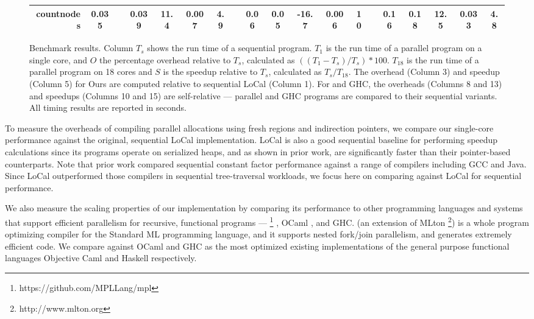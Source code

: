 \begin{figure}
\begin{tabular}{@{}r cc cccc r ccccc r ccccc@{}}
    countnodes & 0.035 && 0.039 & 11.4 & 0.007 & 4.9 && 0.06 & 0.05 & -16.7 & 0.006 & 10 && 0.16 & 0.18 & 12.5 & 0.033 & 4.8 \\

    \bottomrule
  \end{tabular}
  \vspace{2mm}
  \normalsize
  \caption{
    Benchmark results.
    Column $T_s$ shows the run time of a sequential program.
    $T_1$ is the run time of a parallel program on a single core, and
    $O$ the percentage overhead relative to $T_s$, calculated as
    $((T_1 - T_s) / T_s) * 100$.
    $T_{18}$ is the run time of a parallel program on 18 cores and
    $S$ is the speedup relative to $T_s$, calculated as $T_s / T_{18}$.
    The overhead (Column 3) and speedup (Column 5) for Ours are
    computed relative to sequential LoCal (Column 1).
    For \MPL{} and GHC, the overheads (Columns 8 and 13) and speedups (Columns 10 and 15)
    are self-relative ---
    parallel \MPL{} and GHC programs are compared to their sequential variants.
    All timing results are reported in seconds.
  }
  \label{fig:benchmark-results}
\end{figure}

To measure the overheads of compiling parallel allocations using
fresh regions and indirection pointers, we compare our single-core performance
against the original, sequential LoCal implementation.
%
LoCal is also a good sequential baseline for performing speedup calculations
since its programs operate on serialized heaps, and
as shown in prior work, are significantly faster than their pointer-based counterparts.
%
Note that prior work \cite{Gibbon} compared sequential constant factor performance
against a range of compilers including GCC and Java.  Since LoCal
outperformed those compilers in sequential tree-traversal workloads, we focus
here on comparing against LoCal for sequential performance.

We also measure the scaling properties of our implementation by comparing its
performance to other programming languages and systems
that support efficient parallelism for recursive, functional programs
--- \MPL{} \footnote{https://github.com/MPLLang/mpl} \cite{MPL},
OCaml \cite{OCaml}, and GHC.
%
\MPL{} (an extension of MLton \footnote{http://www.mlton.org})
is a whole program optimizing compiler for the Standard ML \cite{StandardML}
programming language,
%
and it supports nested fork/join parallelism, and generates extremely efficient code.
%
%
We compare against OCaml and GHC as the most optimized existing implementations of the
general purpose functional languages Objective Caml and Haskell respectively.

